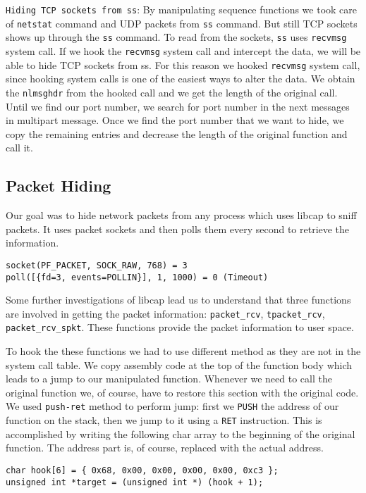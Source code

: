 \documentclass[10pt, letterpaper]{scrartcl}
\begin{document}
\texttt{Hiding TCP sockets from ss}: By manipulating sequence functions we took care of \texttt{netstat} 
command and UDP packets from \texttt{ss} command. But still TCP sockets shows up through the \texttt{ss} command.
To read from the sockets, \texttt{ss} uses \texttt{recvmsg} system call. 
If we hook the \texttt{recvmsg} system call and intercept the data, we will be able to hide TCP sockets from ss. 
For this reason we hooked \texttt{recvmsg} system call, 
since hooking system calls is one of the easiest ways to alter the data.
We obtain the \texttt{nlmsghdr} from the hooked call and we get the length of the original call.
Until we find our port number, we search for port number in the next messages in multipart message. 
Once we find the port number that we want to hide, 
we copy the remaining entries and decrease the length of the original function and call it.


\subsection{Packet Hiding}
Our goal was to hide network packets from any process which uses libcap to sniff packets.
It uses packet sockets and then polls them every second to retrieve the information.   

\begin{verbatim}
socket(PF_PACKET, SOCK_RAW, 768) = 3
poll([{fd=3, events=POLLIN}], 1, 1000) = 0 (Timeout)
\end{verbatim} 

Some further investigations of libcap lead us to understand that three functions are involved in getting the packet information: \texttt{packet\_rcv}, \texttt{tpacket\_rcv}, \texttt{packet\_rcv\_spkt}. These functions provide the packet information to user space.

To hook the these functions we had to use different method as they are not in the system call table. 
We copy assembly code at the top of the function body which leads to a jump to our manipulated function.
Whenever we need to call the original function we, of course, have to restore this section with the original code.
We used \texttt{push-ret} method to perform jump: first we \texttt{PUSH} the address of our function on the stack, then we jump to it using a \texttt{RET} instruction.
This is accomplished by writing the following char array to the beginning of the original function.
The address part is, of course, replaced with the actual address.

\begin{verbatim}
char hook[6] = { 0x68, 0x00, 0x00, 0x00, 0x00, 0xc3 };
unsigned int *target = (unsigned int *) (hook + 1);
\end{verbatim} 
\end{document}
